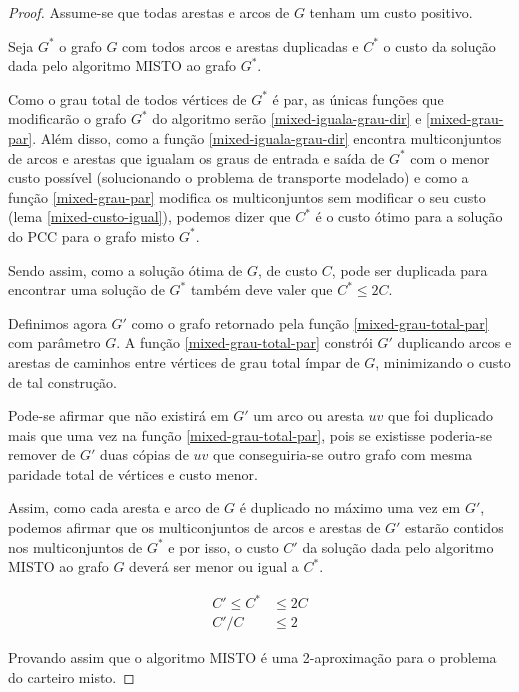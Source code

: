     \begin{proof}
        Assume-se que todas arestas e arcos de $G$ tenham um custo positivo. 

        Seja $G^*$ o grafo $G$ com todos arcos e arestas duplicadas e $C^*$ o custo da solução dada pelo algoritmo MISTO ao grafo $G^*$.

        Como o grau total de todos vértices de $G^*$ é par, as únicas funções que modificarão o grafo $G^*$ do algoritmo serão \ref{mixed-iguala-grau-dir} e \ref{mixed-grau-par}.
        Além disso, como a função \ref{mixed-iguala-grau-dir} encontra multiconjuntos de arcos e arestas que igualam os graus de entrada e saída de $G^*$ com o menor custo possível (solucionando o problema de transporte modelado) e como a função \ref{mixed-grau-par} modifica os multiconjuntos sem modificar o seu custo (lema \ref{mixed-custo-igual}), podemos dizer que $C^*$ é o custo ótimo para a solução do PCC para o grafo misto $G^*$. 

        Sendo assim, como a solução ótima de $G$, de custo $C$, pode ser duplicada para encontrar uma solução de $G^*$ também deve valer que $C^* \leq 2C$.

        Definimos agora $G'$ como o grafo retornado pela função \ref{mixed-grau-total-par} com parâmetro $G$.
        A função \ref{mixed-grau-total-par} constrói $G'$ duplicando arcos e arestas de caminhos entre vértices de grau total ímpar de $G$, minimizando o custo de tal construção.

        Pode-se afirmar que não existirá em $G'$ um arco ou aresta $uv$ que foi duplicado mais que uma vez na função \ref{mixed-grau-total-par}, pois se existisse poderia-se remover de $G'$ duas cópias de $uv$ que conseguiria-se outro grafo com mesma paridade total de vértices e custo menor.

        Assim, como cada aresta e arco de $G$ é duplicado no máximo uma vez em $G'$, podemos afirmar que os multiconjuntos de arcos e arestas de $G'$ estarão contidos nos multiconjuntos de $G^*$ e por isso, o custo $C'$ da solução dada pelo algoritmo MISTO ao grafo $G$ deverá ser menor ou igual a $C^*$.
        
        \begin{align*}
            C' \leq C^* &\leq 2C \\
            C'/C &\leq 2
        \end{align*}

        Provando assim que o algoritmo MISTO é uma 2-aproximação para o problema do carteiro misto.
    \end{proof}


